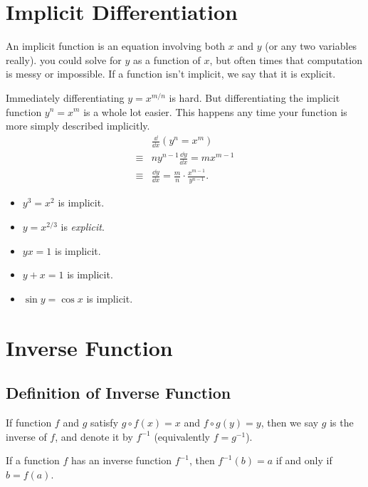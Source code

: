 \section{Implicit Differentiation}
\begin{note} An implicit function is an equation involving both $x$ and $y$ (or any two variables really). you could solve for $y$ as a function of $x$, but often times that computation is messy or impossible. If a function isn't implicit, we say that it is explicit.
\end{note}

Immediately differentiating $y=x^{m/n}$ is hard. But differentiating the implicit function $y^n=x^m$ is a whole lot easier. This happens any time your function is more simply described implicitly.
\begin{align*}
  \phantom{\equiv{}} & \frac{\dd }{\dd x}(y^n=x^m)\\
            \equiv{} & ny^{n-1}\frac{\dd y}{\dd x}=mx^{m-1}\\
            \equiv{} & \frac{\dd y}{\dd x}=\frac m n\cdot\frac{x^{m-1}}{y^{n-1}}.
\end{align*}
\begin{eg}
  \leavevmode
  \begin{itemize}
    \item$y^3=x^2$ is implicit.
    \item$y=x^{2/3}$ is \textit{explicit}.
    \item$yx=1$ is implicit.
    \item$y+x=1$ is implicit.
    \item$\sin y=\cos x$ is implicit.
  \end{itemize}
\end{eg}

\section{Inverse Function}
\subsection{Definition of Inverse Function}
If function $f$ and $g$ satisfy $g\circ f(x)=x$ and $f\circ g(y)=y$, then we say $g$ is the inverse of $f$, and denote it by $f^{-1}$ (equivalently $f=g^{-1}$). 

If a function $f$ has an inverse function $f^{-1}$, then $f^{-1}(b)=a$ if and only if $b=f(a)$.

